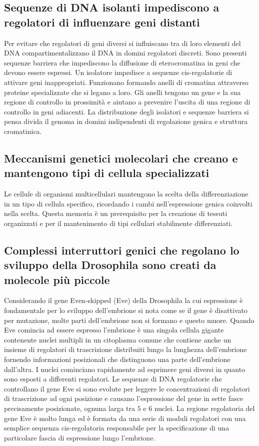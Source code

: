 \subsection{Sequenze di DNA isolanti impediscono a regolatori di influenzare geni distanti}
Per evitare che regolatori di geni diversi si influiscano tra di loro elementi del DNA compartimentalizzano il DNA in domini regolatori discreti. Sono presenti sequenze barriera che
impediscono la diffusione di eterocromatina in geni che devono essere espressi. Un isolatore impedisce a sequenze cis-regolatorie di attivare geni inappropriati. Funzionano formando 
anelli di cromatina attraverso proteine specializzate che si legano a loro. Gli anelli tengono un gene e la sua regione di controllo in prossimit\`a e aiutano a prevenire l'uscita di 
una regione di controllo in geni adiacenti. La distribuzione degli isolatori e sequenze barriera si pensa divida il genoma in domini indipendenti di regolazione genica e struttura 
cromatinica. 
\subsection{Meccanismi genetici molecolari che creano e mantengono tipi di cellula specializzati}
Le cellule di organismi multicellulari mantengono la scelta della differenziazione in un tipo di cellula specifico, ricordando i cambi nell'espressione genica coinvolti nella scelta.
Questa memoria \`e un prerequisito per la creazione di tessuti organizzati e per il mantenimento di tipi cellulari stabilmente differenziati. 
\subsection{Complessi interruttori genici che regolano lo sviluppo della Drosophila sono creati da molecole pi\`u piccole}
Considerando il gene Even-skipped (Eve) della Drosophila la cui espressione \`e fondamentale per lo sviluppo dell'embrione si nota come se il gene \`e disattivato per mutazione, molte
parti dell'embrione non si formano e questo muore. Quando Eve comincia ad essere espresso l'embrione \`e una singola cellula gigante contenente nuclei multipli in un citoplasma comune 
che contiene anche un insieme di regolatori di trascrizione distribuiti lungo la lunghezza dell'embrione fornendo informazioni posizionali che distinguono una parte dell'embrione 
dall'altra. I nuclei cominciano rapidamente ad esprimere geni diversi in quanto sono esposti a differenti regolatori. Le sequenze di DNA regolatorie che controllano il gene Eve si 
sono evolute per leggere le concentrazioni di regolatori di trascrizione ad ogni posizione e causano l'espressione del gene in sette fasce precisamente posizionate, ognuna larga tra
$5$ e $6$ nuclei. La regione regolatoria del gene Eve \`e molto lunga ed \`e formata da una serie di moduli regolatori con una semplice sequenza cis-regolatoria responsabile per la
specificazione di una particolare fascia di espressione lungo l'embrione.
